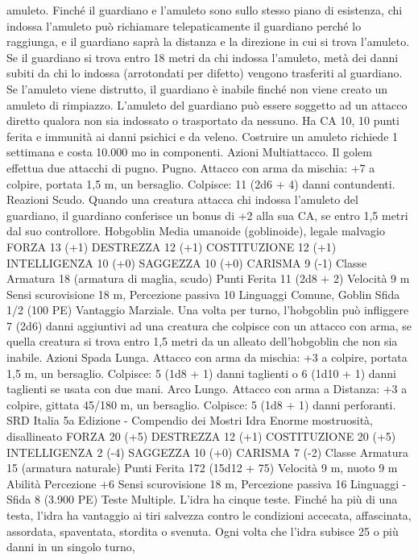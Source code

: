 \begin{multicols}{2}
amuleto. Finché il guardiano e l’amuleto sono sullo stesso piano di
esistenza, chi indossa l’amuleto può richiamare telepaticamente il
guardiano perché lo raggiunga, e il guardiano saprà la distanza e la
direzione in cui si trova l’amuleto. Se il guardiano si trova entro 18
metri da chi indossa l’amuleto, metà dei danni subiti da chi lo
indossa (arrotondati per difetto) vengono trasferiti al guardiano. Se
l’amuleto viene distrutto, il guardiano è inabile finché non viene
creato un amuleto di rimpiazzo. L’amuleto del guardiano può essere
soggetto ad un attacco diretto qualora non sia indossato o trasportato
da nessuno. Ha CA 10, 10 punti ferita e immunità ai danni psichici e
da veleno. Costruire un amuleto richiede 1 settimana e costa 10.000
mo in componenti.
Azioni
Multiattacco. Il golem effettua due attacchi di pugno.
Pugno. Attacco con arma da mischia: +7 a colpire, portata 1,5
m, un bersaglio.
Colpisce: 11 (2d6 + 4) danni contundenti.
Reazioni
Scudo. Quando una creatura attacca chi indossa l’amuleto del
guardiano, il guardiano conferisce un bonus di +2 alla sua CA, se
entro 1,5 metri dal suo controllore.
Hobgoblin
Media umanoide (goblinoide), legale malvagio
FORZA 13 (+1)
DESTREZZA 12 (+1)
COSTITUZIONE 12 (+1)
INTELLIGENZA 10 (+0)
SAGGEZZA 10 (+0)
CARISMA 9 (-1)
Classe Armatura 18 (armatura di maglia, scudo)
Punti Ferita 11 (2d8 + 2)
Velocità 9 m
Sensi scurovisione 18 m, Percezione passiva 10
Linguaggi Comune, Goblin
Sfida 1/2 (100 PE)
Vantaggio Marziale. Una volta per turno, l’hobgoblin può
infliggere 7 (2d6) danni aggiuntivi ad una creatura che colpisce
con un attacco con arma, se quella creatura si trova entro 1,5
metri da un alleato dell’hobgoblin che non sia inabile.
Azioni
Spada Lunga. Attacco con arma da mischia: +3 a colpire,
portata 1,5 m, un bersaglio.
Colpisce: 5 (1d8 + 1) danni taglienti o 6 (1d10 + 1) danni
taglienti se usata con due mani.
Arco Lungo. Attacco con arma a Distanza: +3 a colpire, gittata
45/180 m, un bersaglio.
Colpisce: 5 (1d8 + 1) danni perforanti.
SRD Italia 5a Edizione - Compendio dei Mostri
Idra
Enorme mostruosità, disallineato
FORZA 20 (+5)
DESTREZZA 12 (+1)
COSTITUZIONE 20 (+5)
INTELLIGENZA 2 (-4)
SAGGEZZA 10 (+0)
CARISMA 7 (-2)
Classe Armatura 15 (armatura naturale)
Punti Ferita 172 (15d12 + 75)
Velocità 9 m, nuoto 9 m
Abilità Percezione +6
Sensi scurovisione 18 m, Percezione passiva 16
Linguaggi -
Sfida 8 (3.900 PE)
Teste Multiple. L’idra ha cinque teste. Finché ha più di una testa,
l’idra ha vantaggio ai tiri salvezza contro le condizioni accecata,
affascinata, assordata, spaventata, stordita o svenuta.
Ogni volta che l’idra subisce 25 o più danni in un singolo turno,

\end{multicols}
